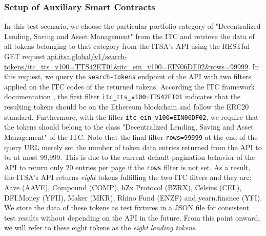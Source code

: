 \subsubsection{Setup of Auxiliary Smart Contracts}

In this test scenario, we choose the particular portfolio category of "Decentralized Lending, Saving and Asset Management" from the ITC and retrieve the data of all tokens belonging to that category from the ITSA's API using the RESTful GET request \url{api.itsa.global/v1/search-tokens/itc\_tts\_v100=TTS42ET01\&itc\_ein\_v100=EIN06DF02\&rows=99999}. In this request, we query the \texttt{search-tokens} endpoint of the API with two filters applied on the ITC codes of the returned tokens. According the ITC framework documentation \cite{itcDocs}, the first filter \texttt{itc\_tts\_v100=TTS42ET01} indicates that the resulting tokens should be on the Ethereum blockchain and follow the ERC20 standard. Furthermore, with the filter \texttt{itc\_ein\_v100=EIN06DF02}, we require that the tokens should belong to the class "Decentralized Lending, Saving and Asset Management" of the ITC. Note that the final filter \texttt{rows=99999} at the end of the query URL merely set the number of token data entries returned from the API to be at most 99,999. This is due to the current default pagination behavior of the API to return only 20 entries per page if the \texttt{rows} filter is not set. As a result, the ITSA's API returns \textit{eight} tokens fulfilling the two ITC filters and they are: Aave (AAVE), Compound (COMP), bZx Protocol (BZRX), Celsius (CEL), DFI.Money (YFII), Maker (MKR), Rhino Fund (ENZF) and yearn.finance (YFI). We store the data of these tokens as test fixtures in a JSON file for consistent test results without depending on the API in the future. From this point onward, we will refer to these eight tokens as the \textit{eight lending tokens}.

